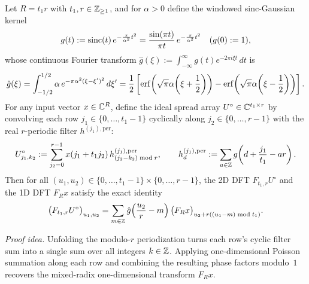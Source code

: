 \begin{theorem}\label{thm:poisson}
Let $R = t_1 r$ with $t_1, r \in \mathbb{Z}_{\ge 1}$, and for $\alpha > 0$ define the windowed sinc-Gaussian kernel
\begin{equation}\label{eq:sinc-gauss}
  g(t) := \operatorname{sinc}(t) \, e^{-\frac{\pi}{\alpha^2} t^2} = \frac{\sin(\pi t)}{\pi t} \, e^{-\frac{\pi}{\alpha^2} t^2} \quad (g(0) := 1),
\end{equation}
whose continuous Fourier transform $\hat{g}(\xi) := \int_{-\infty}^\infty g(t) e^{-2\pi i \xi t}\,dt$ is
\begin{equation}\label{eq:ghat}
  \hat{g}(\xi) = \int_{-1/2}^{1/2} \alpha \, e^{-\pi \alpha^2 (\xi - \xi')^2} \, d\xi' = \frac{1}{2}\left[\operatorname{erf}\!\left(\sqrt{\pi}\alpha\!\left(\xi + \frac{1}{2}\right)\right) - \operatorname{erf}\!\left(\sqrt{\pi}\alpha\!\left(\xi - \frac{1}{2}\right)\right)\right].
\end{equation}
For any input vector $x \in \mathbb{C}^R$, define the ideal spread array $U^\circ \in \mathbb{C}^{t_1 \times r}$ by convolving each row $j_1 \in \{0, \dots, t_1-1\}$ cyclically along $j_2 \in \{0, \dots, r-1\}$ with the real $r$-periodic filter $h^{(j_1),\mathrm{per}}$:
\begin{equation}\label{eq:u-ideal}
  U^\circ_{j_1, k_2} := \sum_{j_2=0}^{r-1} x(j_1 + t_1 j_2) \, h^{(j_1),\mathrm{per}}_{(j_2 - k_2)\bmod r}, \qquad h^{(j_1),\mathrm{per}}_d := \sum_{a \in \mathbb{Z}} g\!\left(d + \frac{j_1}{t_1} - a r\right).
\end{equation}
Then for all $(u_1, u_2) \in \{0, \dots, t_1-1\} \times \{0, \dots, r-1\}$, the 2D DFT $F_{t_1, r} U^\circ$ and the 1D DFT $F_R x$ satisfy the exact identity
\begin{equation}\label{eq:poisson-bridge}
  \bigl(F_{t_1, r} U^\circ\bigr)_{u_1, u_2} = \sum_{m \in \mathbb{Z}} \hat{g}\!\left(\frac{u_2}{r} - m\right) \bigl(F_R x\bigr)_{u_2 + r ((u_1 - m)\bmod t_1)}.
\end{equation}
\end{theorem}

\noindent\emph{Proof idea.} Unfolding the modulo-$r$ periodization turns each row's cyclic filter sum into a single sum over all integers $k \in \mathbb{Z}$. Applying one-dimensional Poisson summation along each row and combining the resulting phase factors modulo~$1$ recovers the mixed-radix one-dimensional transform $F_R x$.

